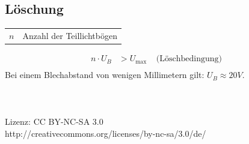 \documentclass[a4paper,twocolumn,10pt]{article}
\begin{document}
\subsection{Löschung}
\begin{tabular}{ll}
$n$ & Anzahl der Teillichtbögen
\end{tabular}
\begin{equation*}
\begin{split}
n\cdot U_B&>U_{\text{max}}\;\;\;\;\text{(Löschbedingung)}\\
\end{split}
\end{equation*}
Bei einem Blechabstand von wenigen Millimetern gilt: $U_B\approx 20V$.
\\\\\\\\
Lizenz: CC BY-NC-SA 3.0\\
http://creativecommons.org/licenses/by-nc-sa/3.0/de/
\end{document}
